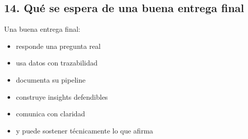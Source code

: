 \documentclass[
]{article}
\providecommand{\tightlist}{%
  \setlength{\itemsep}{0pt}\setlength{\parskip}{0pt}}
\begin{document}
\subsection{14. Qué se espera de una buena entrega
final}\label{14-quuxe9-se-espera-de-una-buena-entrega-final}

Una buena entrega final:

\begin{itemize}
\tightlist
\item
  responde una pregunta real
\item
  usa datos con trazabilidad
\item
  documenta su pipeline
\item
  construye insights defendibles
\item
  comunica con claridad
\item
  y puede sostener técnicamente lo que afirma
\end{itemize}
\end{document}
